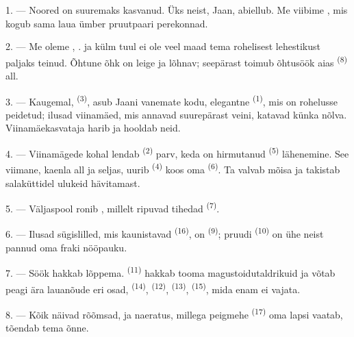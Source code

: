\VUsaut{1.6mm}
\VUsaut{2.6mm}

\VUsaut{3.0mm}

1. --- Noored on suuremaks kasvanud. Üks neist, Jaan, abiellub. Me viibime
, mis kogub sama laua ümber pruutpaari perekonnad.

2. --- Me oleme , .  ja
 külm tuul ei ole veel maad tema rohelisest lehestikust paljaks
teinud. Õhtune õhk on leige ja lõhnav; seepärast toimub õhtusöök aias
 \textsuperscript{(8)} all.

3. --- Kaugemal,  \textsuperscript{(3)}, asub Jaani vanemate kodu,
elegantne  \textsuperscript{(1)}, mis on rohelusse peidetud; ilusad
viinamäed, mis annavad suurepärast veini, katavad künka nõlva. Viinamäekasvataja
harib ja hooldab neid.

4. --- Viinamägede kohal lendab  \textsuperscript{(2)} parv, keda on
hirmutanud  \textsuperscript{(5)} lähenemine. See viimane, 
kaenla all ja  seljas, uurib 
\textsuperscript{(4)} koos oma  \textsuperscript{(6)}. Ta valvab mõisa ja
takistab salaküttidel ulukeid hävitamast.

5. --- Väljaspool  ronib , millelt ripuvad
tihedad  \textsuperscript{(7)}.

6. --- Ilusad sügislilled, mis kaunistavad  \textsuperscript{(16)}, on
 \textsuperscript{(9)}; pruudi  \textsuperscript{(10)} on
ühe neist pannud oma fraki nööpauku.

7. --- Söök hakkab lõppema.  \textsuperscript{(11)} hakkab tooma
magustoidutaldrikuid ja võtab peagi ära lauanõude eri osad, 
\textsuperscript{(14)},  \textsuperscript{(12)}, 
\textsuperscript{(13)},  \textsuperscript{(15)}, mida enam ei vajata.

\VUsaut{3.0mm}

8. --- Kõik näivad rõõmsad, ja naeratus, millega peigmehe 
\textsuperscript{(17)} oma lapsi vaatab, tõendab tema õnne.

